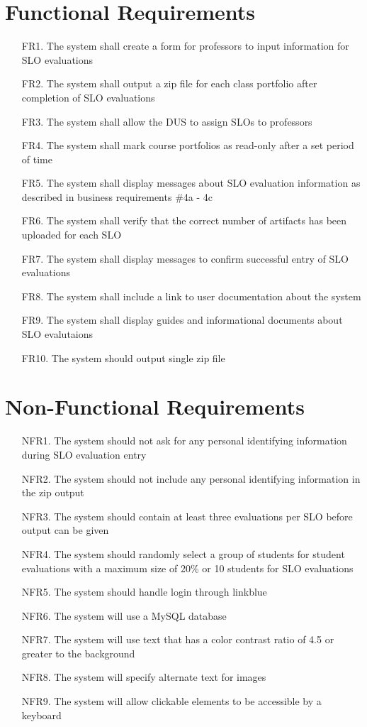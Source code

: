 \documentclass[a4paper,12pt]{article}
\begin{document}
\section*{Functional Requirements}
\begin{enumerate}
\item [FR1.] The system shall create a form for professors to input information for SLO evaluations
\item [FR2.] The system shall output a zip file for each class portfolio after completion of SLO evaluations
\item [FR3.] The system shall allow the DUS to assign SLOs to professors
\item [FR4.] The system shall mark course portfolios as read-only after a set period of time
\item [FR5.] The system shall display messages about SLO evaluation information as described in business requirements {\#4a - 4c}
\item [FR6.] The system shall verify that the correct number of artifacts has been uploaded for each SLO
\item [FR7.] The system shall display messages to confirm successful entry of SLO evaluations 
\item [FR8.] The system shall include a link to user documentation about the system
\item [FR9.] The system shall display guides and informational documents about SLO evalutaions
\item [FR10.] The system should output single zip file
\end{enumerate}

\section*{Non-Functional Requirements}
\begin{enumerate}
\item [NFR1.] The system should not ask for any personal identifying information during SLO evaluation entry
\item [NFR2.] The system should not include any personal identifying information in the zip output
\item [NFR3.] The system should contain at least three evaluations per SLO before output can be given
\item [NFR4.] The system should randomly select a group of students for student evaluations with a maximum size of 20\% or 10 students for SLO evaluations
\item [NFR5.] The system should handle login through linkblue
\item [NFR6.] The system will use a MySQL database
\item [NFR7.] The system will use text that has a color contrast ratio of 4.5 or greater to the background
\item [NFR8.] The system will specify alternate text for images
\item [NFR9.] The system will allow clickable elements to be accessible by a keyboard
\end{enumerate}
\end{document}
